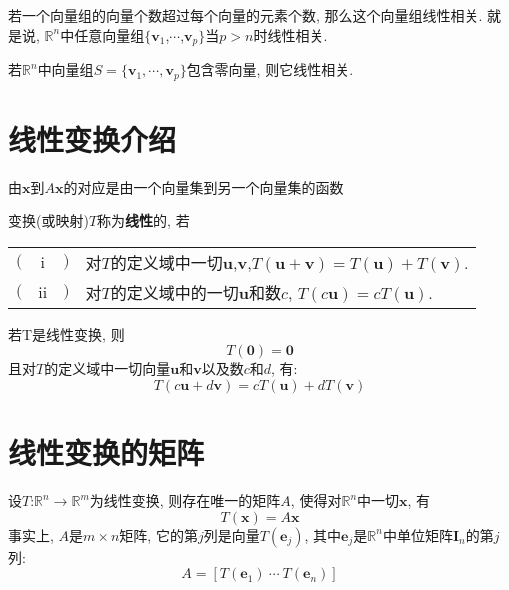 \begin{TheoremOne}
若一个向量组的向量个数超过每个向量的元素个数, 那么这个向量组线性相关. 就是说, $\mathbb{R}^n$中任意向量组$\{\bm{v}_1$,$\cdots$,$\bm{v}_p\}$当$p>n$时线性相关.
\end{TheoremOne}\vspace{4ex}

\begin{TheoremOne}
若$\mathbb{R}^n$中向量组$S=\{\bm{v}_1,\cdots,\bm{v}_p\}$包含零向量, 则它线性相关.
\end{TheoremOne}\vspace{4ex}

\section{线性变换介绍}
由$\bm{x}$到$A\bm{x}$的对应是由一个向量集到另一个向量集的函数\\[2ex]

\begin{definition}
变换(或映射)$T$称为\textbf{线性}的, 若\\
\begin{tabular}{l@{}c@{}l@{\hspace{2pt}}l}
$($ & i & $)$ & 对$T$的定义域中一切$\bm{u}$,$\bm{v}$,$T(\bm{u}+\bm{v})=T(\bm{u})+T(\bm{v})$.\\
$($ & ii & $)$ & 对$T$的定义域中的一切$\bm{u}$和数$c$, $T(c\bm{u})=cT(\bm{u})$.
\end{tabular}
\end{definition}\vspace{4ex}

\begin{law}
若T是线性变换, 则
\[T(\bm{0})=\bm{0}\]
且对$T$的定义域中一切向量$\bm{u}$和$\bm{v}$以及数$c$和$d$, 有:
\[T(c\bm{u}+d\bm{v})=cT(\bm{u})+dT(\bm{v})\]
\end{law}\vspace{6ex}

\section{线性变换的矩阵}
\begin{TheoremOne}
设$T$:$\mathbb{R}^n\rightarrow\mathbb{R}^m$为线性变换, 则存在唯一的矩阵$A$, 使得对$\mathbb{R}^n$中一切$\bm{x}$, 有
\[T(\bm{x})=A\bm{x}\]
事实上, $A$是$m\times n$矩阵, 它的第$j$列是向量$T(\bm{e}_j)$, 其中$\bm{e}_j$是$\mathbb{R}^n$中单位矩阵$\bm{I}_n$的第$j$列:
\[A=[T(\bm{e}_1)\ \cdots\ T(\bm{e}_n)]\]
\end{TheoremOne}\vspace{4ex}


